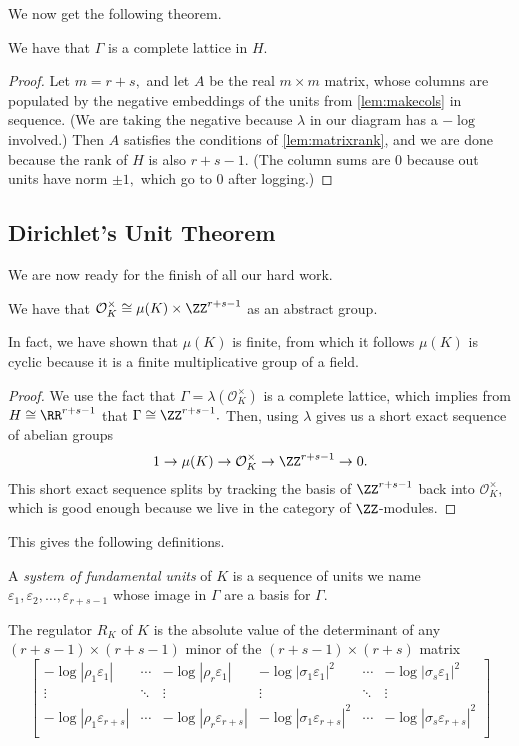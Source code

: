 \documentclass[../notes.tex]{subfiles}
\begin{document}
We now get the following theorem.
\begin{theorem}
    We have that $\Gamma$ is a complete lattice in $H.$
\end{theorem}
\begin{proof}
    Let $m=r+s,$ and let $A$ be the real $m\times m$ matrix, whose columns are populated by the negative embeddings of the units from \autoref{lem:makecols} in sequence. (We are taking the negative because $\lambda$ in our diagram has a $-\log$ involved.) Then $A$ satisfies the conditions of \autoref{lem:matrixrank}, and we are done because the rank of $H$ is also $r+s-1.$ (The column sums are $0$ because out units have norm $\pm1,$ which go to $0$ after logging.)
\end{proof}

\subsection{Dirichlet's Unit Theorem}
We are now ready for the finish of all our hard work.
\begin{theorem}
    We have that $\mathcal O_K^\times\cong\mu(K)\times\ZZ^{r+s-1}$ as an abstract group.
\end{theorem}
\begin{remark}
    In fact, we have shown that $\mu(K)$ is finite, from which it follows $\mu(K)$ is cyclic because it is a finite multiplicative group of a field.
\end{remark}
\begin{proof}
    We use the fact that $\Gamma=\lambda(\mathcal O_K^\times)$ is a complete lattice, which implies from $H\cong\RR^{r+s-1}$ that $\Gamma\cong\ZZ^{r+s-1}.$ Then, using $\lambda$ gives us a short exact sequence of abelian groups
    \[1\to\mu(K)\to\mathcal O_K^\times\to\ZZ^{r+s-1}\to0.\]
    This short exact sequence splits by tracking the basis of $\ZZ^{r+s-1}$ back into $\mathcal O_K^\times,$ which is good enough because we live in the category of $\ZZ$-modules.
\end{proof}
This gives the following definitions.
\begin{definition}
    A \textit{system of fundamental units} of $K$ is a sequence of units we name $\varepsilon_1,\varepsilon_2,\ldots,\varepsilon_{r+s-1}$ whose image in $\Gamma$ are a basis for $\Gamma.$
\end{definition}
\begin{definition}[Regulator]
    The regulator $R_K$ of $K$ is the absolute value of the determinant of any $(r+s-1)\times(r+s-1)$ minor of the $(r+s-1)\times(r+s)$ matrix
    \[\begin{bmatrix}
        -\log|\rho_1\varepsilon_1| & \cdots & -\log|\rho_r\varepsilon_1| & -\log|\sigma_1\varepsilon_1|^2 & \cdots & -\log|\sigma_s\varepsilon_1|^2 \\
        \vdots & \ddots & \vdots & \vdots & \ddots & \vdots \\
        -\log|\rho_1\varepsilon_{r+s}| & \cdots & -\log|\rho_r\varepsilon_{r+s}| & -\log|\sigma_1\varepsilon_{r+s}|^2 & \cdots & -\log|\sigma_s\varepsilon_{r+s}|^2 \\
    \end{bmatrix}\]
\end{definition}
\end{document}
